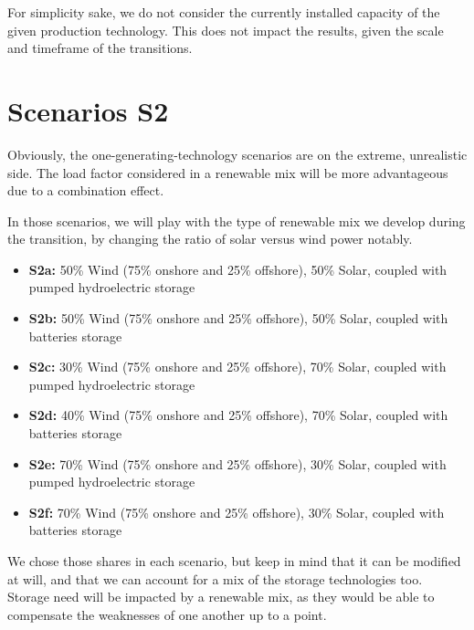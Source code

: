 For simplicity sake, we do not consider the currently installed capacity of the given production technology. This does not impact the results, given the scale and timeframe of the transitions.


\section{Scenarios S2}

Obviously, the one-generating-technology scenarios are on the extreme, unrealistic side. The load factor considered in a renewable mix will be more advantageous due to a combination effect.

In those scenarios, we will play with the type of renewable mix we develop during the transition, by changing the ratio of solar versus wind power notably.


\begin{kaobox}[frametitle=S2 scenarios]
\begin{itemize}
	\item \textbf{S2a:} 50\% Wind (75\% onshore and 25\% offshore), 50\% Solar, coupled with pumped hydroelectric storage
	\item \textbf{S2b:} 50\% Wind (75\% onshore and 25\% offshore), 50\% Solar, coupled with batteries storage
	\item \textbf{S2c:} 30\% Wind (75\% onshore and 25\% offshore), 70\% Solar, coupled with pumped hydroelectric storage
	\item \textbf{S2d:} 40\% Wind (75\% onshore and 25\% offshore), 70\% Solar, coupled with batteries storage
	\item \textbf{S2e:} 70\% Wind (75\% onshore and 25\% offshore), 30\% Solar, coupled with pumped hydroelectric storage
	\item \textbf{S2f:} 70\% Wind (75\% onshore and 25\% offshore), 30\% Solar, coupled with batteries storage
\end{itemize}
\end{kaobox}

We chose those shares in each scenario, but keep in mind that it can be modified at will, and that we can account for a mix of the storage technologies too. Storage need will be impacted by a renewable mix, as they would be able to compensate the weaknesses of one another up to a point.


